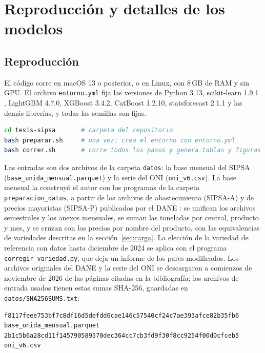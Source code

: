 \chapter{Reproducción y detalles de los modelos}
\label{ap:general}

\section{Reproducción}
\label{ap:reproduccion}

El código corre en macOS 13 o posterior, o en Linux, con 8\,GB de RAM y sin GPU. El archivo \texttt{entorno.yml} fija las versiones de Python 3.13, scikit-learn 1.9.1 \citep{pedregosa2011}, LightGBM 4.7.0, XGBoost 3.4.2, CatBoost 1.2.10, statsforecast 2.1.1 y las demás librerías, y todas las semillas son fijas.

\begin{lstlisting}[language=bash]
cd tesis-sipsa       # carpeta del repositorio
bash preparar.sh     # una vez: crea el entorno con entorno.yml
bash correr.sh       # corre todos los pasos y genera tablas y figuras
\end{lstlisting}

Las entradas son dos archivos de la carpeta \texttt{datos}: la base mensual del SIPSA (\texttt{base\_unida\_mensual.parquet}) y la serie del ONI (\texttt{oni\_v6.csv}). La base mensual la construyó el autor con los programas de la carpeta \texttt{preparacion\_datos}, a partir de los archivos de abastecimiento (SIPSA-A) y de precios mayoristas (SIPSA-P) publicados por el DANE \citep{dane}: se unifican los archivos semestrales y los anexos mensuales, se suman las toneladas por central, producto y mes, y se cruzan con los precios por nombre del producto, con las equivalencias de variedades descritas en la sección~\ref{sec:carga}. La elección de la variedad de referencia con datos hasta diciembre de 2024 se aplica con el programa \texttt{corregir\_variedad.py}, que deja un informe de los pares modificados. Los archivos originales del DANE y la serie del ONI se descargaron a comienzos de noviembre de 2026 de las páginas citadas en la bibliografía; los archivos de entrada usados tienen estas sumas SHA-256, guardadas en \texttt{datos/SHA256SUMS.txt}:

\begin{lstlisting}
f8117feee753bf7c8df16d5defdd6cae146c57540cf24c7ae393afce82b35fb6  base_unida_mensual.parquet
2b1c5b6a28cd11f145790589570dec364cc7cb3fd9f30f8cc9254f00d0cfceb5  oni_v6.csv
\end{lstlisting}

